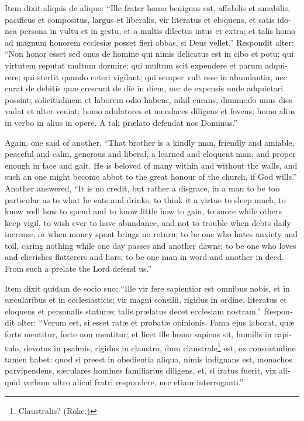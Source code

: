 \documentclass[10pt]{book}
\begin{document}
\begin{paracol}{2}
\switchcolumn*

\begin{otherlanguage}{latin}
Item dixit aliquis de aliquo: ``Ille frater homo benignus est, affabilis et amabilis, pacificus et compositus, largus et liberalis, vir literatus et eloquens, et satis idonea persona in vultu et in gestu, et a multis dilectus intus et extra; et talis homo ad magnum honorem ecclesi\ae{} posset fieri abbas, si Deus vellet.'' Respondit alter: ``Non honor esset sed onus de homine qui nimis delicatus est in cibo et potu; qui virtutem reputat multum dormire; qui multum scit expendere et parum adquirere; qui stertit quando ceteri vigilant; qui semper vult esse in abundantia, nec curat de debitis qu\ae{} crescunt de die in diem, nec de expensis unde adquietari possint; solicitudinem et laborem odio habens, nihil curans, dummodo unus dies vadat et alter veniat; homo adulatores et mendaces diligens et fovens; homo alius in verbo in alius in opere. A tali pr\ae{}lato defendat nos Dominus.''
\end{otherlanguage}

\switchcolumn

Again, one said of another, ``That brother is a kindly man, friendly and amiable, peaceful and calm, generous and liberal, a learned and eloquent man, and proper enough in face and gait. He is beloved of many within and without the walls, and such an one might become abbot to the great honour of the church, if God wills.'' Another answered, ``It is no credit, but rather a disgrace, in a man to be too particular as to what he eats and drinks, to think it a virtue to sleep much, to know well how to spend and to know little how to gain, to snore while others keep vigil, to wish ever to have abundance, and not to trouble when debts daily increase, or when money spent brings no return; to be one who hates anxiety and toil, caring nothing while one day passes and another dawns; to be one who loves and cherishes flatterers and liars; to be one man in word and another in deed. From such a prelate the Lord defend us.''

\switchcolumn*

\begin{otherlanguage}{latin}
Item dixit quidam de socio suo: ``Ille vir fere sapientior est omnibus nobis, et in s\ae{}cularibus et in ecclesiasticis; vir magni consilii, rigidus in ordine, literatus et eloquens et personalis statur\ae{}: talis pr\ae{}latus decet ecclesiam nostram.'' Respondit alter: ``Verum est, si esset rat\ae{} et probat\ae{} opinionis. Fama ejus laborat, qu\ae{} forte mentitur, forte non mentitur; et licet ille homo sapiens sit, humilis in capitulo, devotus in psalmis, rigidus in claustro, dum claustrale\footnote[\textdagger]{Claustralis? (Roke.)} est, ex consuetudine tamen habet: quod si preest in obedientia aliqua, nimis indignans est, monachos parvipendens, s\ae{}culares homines familiarius diligens, et, si iratus fuerit, vix aliquid verbum ultro alicui fratri respondere, nec etiam interroganti.''
\end{otherlanguage}


\end{paracol}
\end{document}
